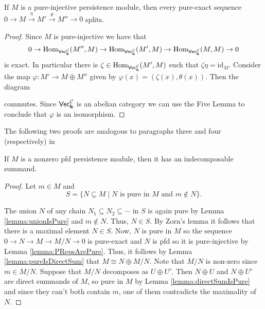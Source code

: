 \begin{lemma}\label{lemma:pureIsDirectSum}
    If $M$ is a pure-injective persistence module, then every pure-exact sequence $0\to M\xrightarrow{\eta} M'\xrightarrow{\theta} M''\to 0$ splits.
\end{lemma}
\begin{proof}
    Since $M$ is pure-injective we have that
    \[ 0\to \operatorname{Hom}_{\normalfont\mathsf{Vec}_{\mathbf{k}}^{\mathcal{C}}}(M'', M)\to \operatorname{Hom}_{\normalfont\mathsf{Vec}_{\mathbf{k}}^{\mathcal{C}}}(M',M)\to \operatorname{Hom}_{\normalfont\mathsf{Vec}_{\mathbf{k}}^{\mathcal{C}}}(M,M)\to 0 \]
    is exact. In particular there is $\zeta\in\operatorname{Hom}_{\normalfont\mathsf{Vec}_{\mathbf{k}}^{\mathcal{C}}}(M',M)$ such that $\zeta\eta=\text{id}_M$.
    Consider the map $\varphi:M'\to M\oplus M''$ given by $\varphi(x)=(\zeta(x),\theta(x))$.
    Then the diagram
    \begin{center}
    \end{center}
    commutes.
    Since $\normalfont\mathsf{Vec}_{\mathbf{k}}^{\mathcal{C}}$ is an abelian category we can use the Five Lemma to conclude that $\varphi$ is an isomorphism.
\end{proof}

The following two proofs are analogous to paragraphs three and four (respectively) in \cite[p. 163]{jensen_lenzing_1989}
\begin{lemma}\label{lemma:indecomposableSummand}
    If $M$ is a nonzero pfd persistence module, then it has an indecomposable summand.
\end{lemma}
\begin{proof}
    Let $m\in M$ and 
    \[S=\{N\subseteq M\mid N\text{ is pure in }M\text{ and }m\not\in N\}.\]

    The union $N$ of any chain $N_1\subseteq N_2\subseteq\cdots$ in $S$ is again pure by Lemma \ref{lemma:unionIsPure} and $m\not\in N$. 
    Thus, $N\in S$.
    By Zorn's lemma it follows that there is a maximal element $N\in S$.
    Now, $N$ is pure in $M$ so the sequence $0\to N\to M\to M/N\to 0$ is pure-exact and $N$ is pfd so it is pure-injective by Lemma \ref{lemma:PRepsArePure}.
    Thus, it follows by Lemma \ref{lemma:pureIsDirectSum} that $M\cong N\oplus M/N$. 
    Note that $M/N$ is non-zero since $m\in M/N$.
    Suppose that $M/N$ decomposes as $U\oplus U'$.
    Then $N\oplus U$ and $N\oplus U'$ are direct summands of $M$, so pure in $M$ by Lemma \ref{lemma:directSumIsPure} and since they can't both contain $m$, one of them contradicts the maximality of $N$.
\end{proof}

